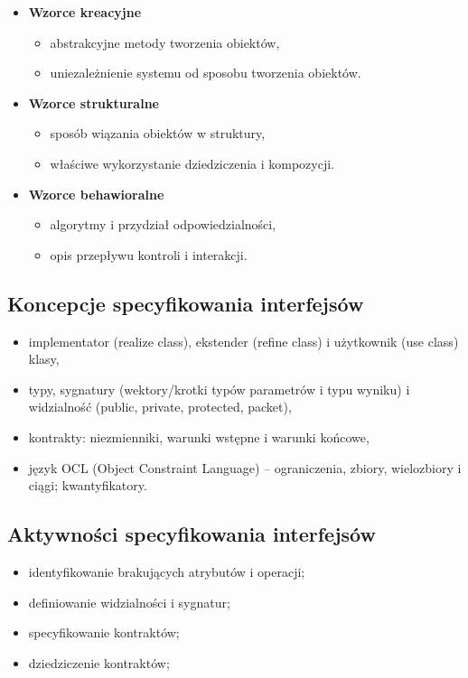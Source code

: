\documentclass[a4paper]{article}
\begin{document}
    \begin{itemize}
        \item \textbf{Wzorce kreacyjne}
        \begin{itemize}
            \item abstrakcyjne metody tworzenia obiektów,
            \item uniezależnienie systemu od sposobu tworzenia obiektów.
        \end{itemize}
        \item \textbf{Wzorce strukturalne}
        \begin{itemize}
            \item sposób wiązania obiektów w struktury,
            \item właściwe wykorzystanie dziedziczenia i kompozycji.
        \end{itemize}
        \item \textbf{Wzorce behawioralne}
        \begin{itemize}
            \item algorytmy i przydział odpowiedzialności,
            \item opis przepływu kontroli i interakcji.
        \end{itemize}
    \end{itemize}

    \subsection{Koncepcje specyfikowania interfejsów}
    \begin{itemize}
        \item implementator (realize class), ekstender (refine class) i użytkownik (use class) klasy,
        \item typy, sygnatury (wektory/krotki typów parametrów i typu wyniku) i widzialność (public, private, protected, packet),
        \item kontrakty: niezmienniki, warunki wstępne i warunki końcowe,
        \item język OCL (Object Constraint Language) – ograniczenia, zbiory, wielozbiory i ciągi; kwantyfikatory.
    \end{itemize}

    \subsection{Aktywności specyfikowania interfejsów}
    \begin{itemize}
        \item identyfikowanie brakujących atrybutów i operacji;
        \item definiowanie widzialności i sygnatur;
        \item specyfikowanie kontraktów;
        \item dziedziczenie kontraktów;
    \end{itemize}
\end{document}
